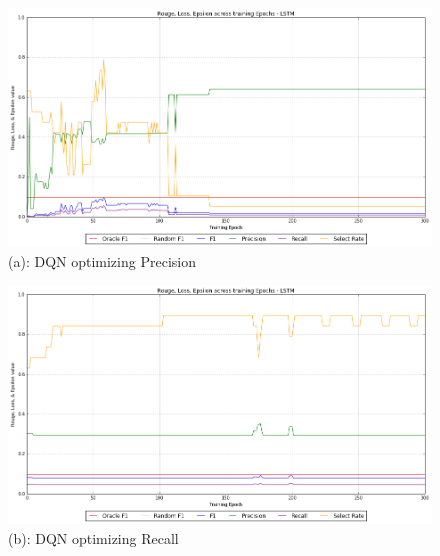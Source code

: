\documentclass[12pt]{article}
\begin{document}
\begin{figure}
  \centering
  \begin{minipage}[b]{0.6\textwidth}
    \captionsetup{labelformat=empty}
    \includegraphics[width=\textwidth]{DQN_LSTM_Precision}
    \caption{ \scriptsize (a): DQN optimizing Precision}
  \end{minipage}
\end{figure}
\begin{figure}
  \centering
  \begin{minipage}[b]{0.6\textwidth}
    \captionsetup{labelformat=empty}
    \includegraphics[width=\textwidth]{DQN_LSTM_Recall}
    \caption{\scriptsize (b): DQN optimizing Recall}
  \end{minipage}
    \captionsetup{labelformat=empty}
\end{figure}
\end{document}

